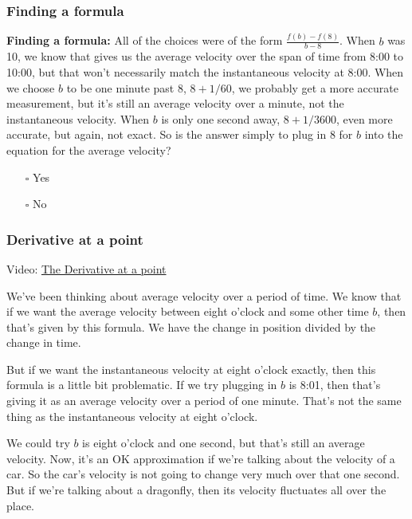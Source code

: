 \documentclass[pdftex, brazil, 12pt, twoside]{article}
\begin{document}
\subsubsection{Finding a formula}
\label{u1-what-formula}

\begin{exercise}
  \textbf{Finding a formula:} All of the choices were of the form
  $\displaystyle \frac{f(b)-f(8)}{b-8}$. When $b$ was 10, we know that gives us
  the average velocity over the span of time from 8:00 to 10:00, but that won't
  necessarily match the instantaneous velocity at 8:00. When we choose $b$ to be
  one minute past 8, $8 + 1/60$, we probably get a more accurate measurement,
  but it's still an average velocity over a minute, not the instantaneous velocity.
  When $b$ is only one second away, $8 + 1/3600$, even more accurate, but again,
  not exact. So is the answer simply to plug in 8 for $b$ into the equation for
  the average velocity?
\begin{itemize}[noitemsep]
\item[$\square$] Yes
\item[$\square$] No
\end{itemize}
\end{exercise}

\subsubsection{Derivative at a point}
\label{u1-what-derivative-at-a-point}

Video: \href{https://www.youtube.com/watch?v=ABT4OYvSAZ4}{The Derivative at a point}

We've been thinking about average velocity
over a period of time.
We know that if we want the average velocity between eight
o'clock and some other time $b$, then
that's given by this formula.
We have the change in position divided by the change in time.

But if we want the instantaneous velocity at eight o'clock
exactly, then this formula is a little bit problematic.
If we try plugging in $b$ is 8:01, then that's
giving it as an average velocity over a period of one minute.
That's not the same thing as the instantaneous velocity
at eight o'clock.

We could try $b$ is eight o'clock and one second,
but that's still an average velocity.
Now, it's an OK approximation if we're talking
about the velocity of a car.
So the car's velocity is not going
to change very much over that one second.
But if we're talking about a dragonfly,
then its velocity fluctuates all over the place.
\end{document}
